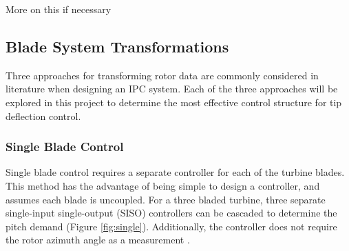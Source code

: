 More on this if necessary




\subsection{Blade System Transformations}
Three approaches for transforming rotor data are commonly considered in literature when designing an IPC system. Each of the three approaches will be explored in this project to determine the most effective control structure for tip deflection control. 
\subsubsection{Single Blade Control}
Single blade control requires a separate controller for each of the turbine blades. This method has the advantage of being simple to design a controller, and assumes each blade is uncoupled. For a three bladed turbine, three separate single-input single-output (SISO) controllers can be cascaded to determine the pitch demand (Figure \ref{fig:single}). Additionally, the controller does not require the rotor azimuth angle as a measurement \citep{19_Lio}.


